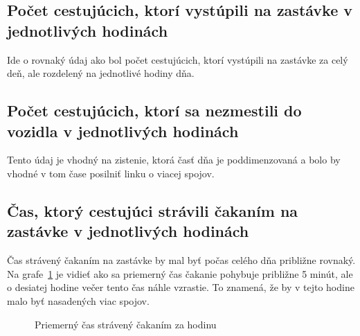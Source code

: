 \subsection*{Počet cestujúcich, ktorí vystúpili na zastávke v jednotlivých hodinách}
Ide o rovnaký údaj ako bol počet cestujúcich, ktorí vystúpili na zastávke za celý deň, ale rozdelený na jednotlivé hodiny dňa.

\subsection*{Počet cestujúcich, ktorí sa nezmestili do vozidla v jednotlivých hodinách}
Tento údaj je vhodný na zistenie, ktorá časť dňa je poddimenzovaná a bolo by vhodné v tom čase posilniť linku o viacej spojov.

\subsection*{Čas, ktorý cestujúci strávili čakaním na zastávke v jednotlivých hodinách}
Čas strávený čakaním na zastávke by mal byť počas celého dňa približne rovnaký.
Na grafe~\ref{fig:timeSpentWaitingPerHour} je vidieť ako sa priemerný čas čakanie pohybuje približne 5 minút, ale o desiatej hodine večer tento čas náhle vzrastie.
To znamená, že by v tejto hodine malo byť nasadených viac spojov.
\begin{figure}[h]\label{fig:timeSpentWaitingPerHour}
  \centering
  \caption{Priemerný čas strávený čakaním za hodinu}
\end{figure}

